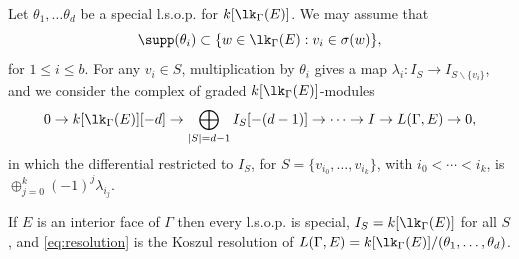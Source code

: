 Let $\theta_1, \ldots \theta_d$ be a special l.s.o.p. for $k[\lk_\Gamma(E)]$. We may assume that 
\[
\supp(\theta_i) \subset \{ w \in \lk_\Gamma(E) : v_i \in \sigma(w) \},
\]
for $1 \leq i \leq b$.  For any $v_i \in S$, multiplication by $\theta_i$ gives a map $\lambda_i \colon I_{S} \to I_{S \smallsetminus \{v_i\}}$, and we consider the complex of graded $k[\lk_{\Gamma}(E)]$-modules
 \begin{equation} \label{eq:resolution}
 0  \to k[\lk_{\Gamma}(E)][-d] \to \bigoplus_{ |S|  = d - 1 } I_{S}[-(d-1)] \to \dotsb  \to  I \to L(\Gamma,E) \to 0,
\end{equation}
in which
 the differential restricted to $I_S$, for $S= \{v_{i_0}, \ldots, v_{i_k}\}$, with $i_0 < \cdots < i_k$, is $\oplus_{j = 0}^k (-1)^j \lambda_{i_j}$. 


\begin{example}
If $E$ is an interior face of $\Gamma$ then every l.s.o.p. is special, $I_S = k[\lk_{\Gamma}(E)]$ for all $S$, and \eqref{eq:resolution} is the Koszul resolution of $L(\Gamma,E) = k[\lk_{\Gamma}(E)]/(\theta_1,\ldots,\theta_{d})$.
\end{example}

